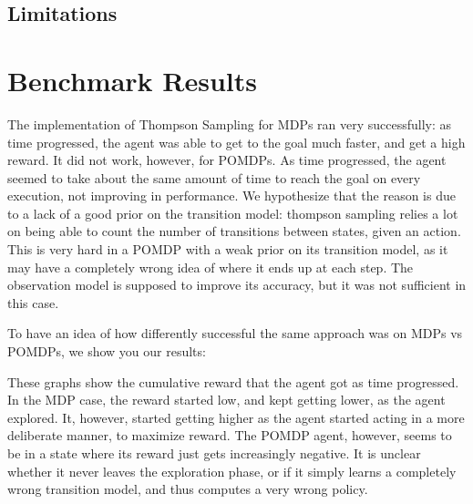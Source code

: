 \documentclass{pset}
\begin{document}
\subsection{Limitations}

\section{Benchmark Results}
The implementation of Thompson Sampling for MDPs ran very successfully: as time
progressed, the agent was able to get to the goal much faster, and get a high
reward. It did not work, however, for POMDPs. As time progressed, the agent seemed
to take about the same amount of time to reach the goal on every execution, not
improving in performance. We hypothesize that the reason is due to a lack of
a good prior on the transition model: thompson sampling relies a lot on being
able to count the number of transitions between states, given an action. This
is very hard in a POMDP with a weak prior on its transition model, as it may have
a completely wrong idea of where it ends up at each step. The observation model
is supposed to improve its accuracy, but it was not sufficient in this case.

To have an idea of how differently successful the same approach was on MDPs vs
POMDPs, we show you our results:


These graphs show the cumulative reward that the agent got as time progressed.
In the MDP case, the reward started low, and kept getting lower, as the agent
explored. It, however, started getting higher as the agent started acting in a
more deliberate manner, to maximize reward. The POMDP agent, however, seems to
be in a state where its reward just gets increasingly negative. It is unclear
whether it never leaves the exploration phase, or if it simply learns a completely
wrong transition model, and thus computes a very wrong policy.






\end{document}
